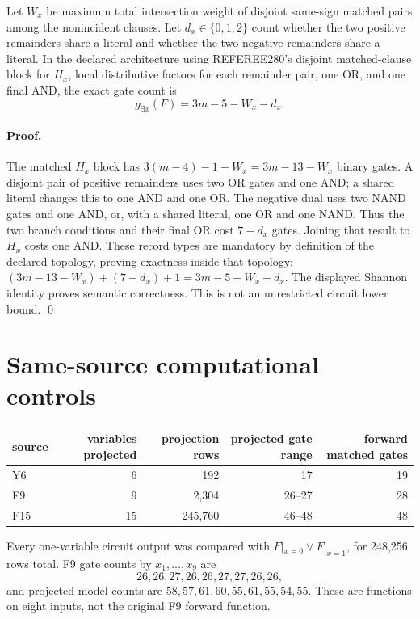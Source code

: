 \documentclass[11pt]{article}
\begin{document}
Let $W_x$ be maximum total intersection weight of disjoint same-sign matched
pairs among the nonincident clauses.  Let $d_x\in\{0,1,2\}$ count whether
the two positive remainders share a literal and whether the two negative
remainders share a literal.  In the declared architecture using
REFEREE280's disjoint matched-clause block for $H_x$, local distributive
factors for each remainder pair, one OR, and one final AND, the exact gate
count is
\[
 g_{\exists x}(F)=3m-5-W_x-d_x.
\]

\paragraph{Proof.}
The matched $H_x$ block has $3(m-4)-1-W_x=3m-13-W_x$
binary gates.  A disjoint pair of positive remainders uses two OR gates and
one AND; a shared literal changes this to one AND and one OR.  The negative
dual uses two NAND gates and one AND, or, with a shared literal, one OR and
one NAND.  Thus the two branch conditions and their final OR cost
$7-d_x$ gates.  Joining that result to $H_x$ costs one AND.  These record
types are mandatory by definition of the declared topology, proving exactness
inside that topology:
$(3m-13-W_x)+(7-d_x)+1=3m-5-W_x-d_x$.  The displayed
Shannon identity proves semantic correctness.  This is not an unrestricted
circuit lower bound. \qed

\section{Same-source computational controls}

\begin{center}
\begin{tabular}{lrrrr}
\toprule
source & variables projected & projection rows & projected gate range & forward matched gates\\
\midrule
Y6  & 6  & 192     & 17 & 19\\
F9  & 9  & 2,304   & 26--27 & 28\\
F15 & 15 & 245,760 & 46--48 & 48\\
\bottomrule
\end{tabular}
\end{center}

Every one-variable circuit output was compared with
$F|_{x=0}\vee F|_{x=1}$, for 248,256 rows total.  F9 gate counts by
$x_1,\ldots,x_9$ are
\[
 26,26,27,26,26,27,27,26,26,
\]
and projected model counts are
$58,57,61,60,55,61,55,54,55$.  These are functions on eight inputs, not
the original F9 forward function.
\end{document}
